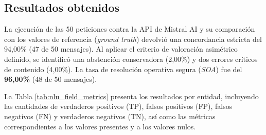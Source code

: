 \documentclass[12pt,a4paper]{report}
\begin{document}
\subsection{Resultados obtenidos}

La ejecución de las 50 peticiones contra la API de Mistral AI y su comparación con los valores de referencia (\textit{ground truth}) devolvió una concordancia estricta del 94,00\% (47 de 50 mensajes). Al aplicar el criterio de valoración asimétrico definido, se identificó una abstención conservadora (2,00\%) y dos errores críticos de contenido (4,00\%). La tasa de resolución operativa segura (\textit{SOA}) fue del \textbf{96,00\%} (48 de 50 mensajes).

La Tabla \ref{tab:nlu_field_metrics} presenta los resultados por entidad, incluyendo las cantidades de verdaderos positivos (TP), falsos positivos (FP), falsos negativos (FN) y verdaderos negativos (TN), así como las métricas correspondientes a los valores presentes y a los valores nulos.

\begin{table}[H]
\centering
{}
\caption{Métricas de extracción del componente NLU por entidad.}
\label{tab:nlu_field_metrics}
\end{table}
\end{document}
